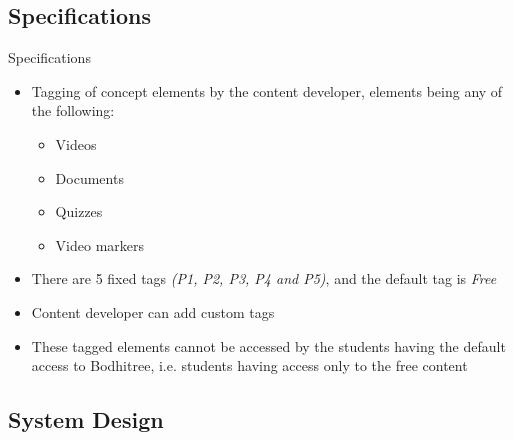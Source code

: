 \documentclass{beamer}
\begin{document}
\subsection{Specifications}

\begin{frame}{Specifications}
	\begin{itemize}
		\item Tagging of concept elements by the content developer, elements being any of the following:
		\begin{itemize}
			\item Videos
			\item Documents
			\item Quizzes
			\item Video markers
		\end{itemize}
		\item There are 5 fixed tags \textit{(P1, P2, P3, P4 and P5)}, and the default tag is \textit{Free}
		\item Content developer can add custom tags
		\item These tagged elements cannot be accessed by the students having the default
		access to Bodhitree, i.e. students having access only to the free content
	\end{itemize}
\end{frame}


\subsection{System Design}
\end{document}
